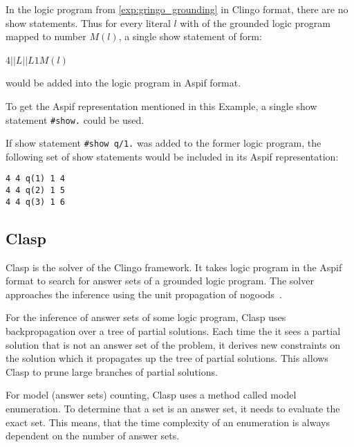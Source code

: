 \begin{example}
    In the logic program from \cref{exp:gringo_grounding} in Clingo format,
    there are no show statements. Thus for every literal $l$ with of the grounded
    logic program mapped to number $M(l)$, a single show statement of form:
    \begin{center}
        4\ms{}$||L||$\ms{}$L$\ms{}$1$\ms{}$M(l)$
    \end{center}
    would be added into the logic program in Aspif format.

    To get the Aspif representation mentioned in this Example,
    a single show statement \texttt{\#show.} could be used.

    If show statement \texttt{\#show q/1.} was added to the former logic program,
    the following set of show statements would be included in its Aspif
    representation:
    \begin{lstlisting}[firstnumber=26]
4 4 q(1) 1 4
4 4 q(2) 1 5
4 4 q(3) 1 6
\end{lstlisting}
\end{example}

\subsection{Clasp}\label{sec:clasp}

Clasp is the solver of the Clingo framework. It takes logic program in the Aspif
format to search for answer sets of a grounded logic program.
The solver approaches the inference using the unit propagation
of nogoods~\cite{DBLP:journals/ai/GebserKS12}.

For the inference of answer sets of some logic program,
Clasp uses backpropagation over a tree of partial solutions.
Each time the it sees a partial solution that is not an answer set
of the problem, it derives new constraints on the solution which it
propagates up the tree of partial solutions. This allows Clasp
to prune large branches of partial solutions.

For model (answer sets) counting, Clasp uses a method
called model enumeration. To determine that a set is an answer set,
it needs to evaluate the exact set. This means, that the time complexity
of an enumeration is always dependent on the number of answer sets.

